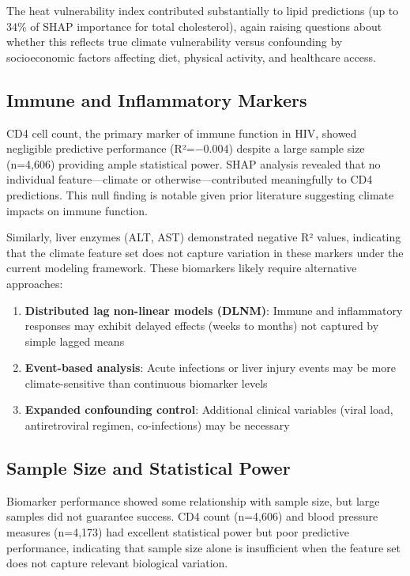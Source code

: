The heat vulnerability index contributed substantially to lipid predictions (up to 34\% of SHAP importance for total cholesterol), again raising questions about whether this reflects true climate vulnerability versus confounding by socioeconomic factors affecting diet, physical activity, and healthcare access.

\subsection{Immune and Inflammatory Markers}

CD4 cell count, the primary marker of immune function in HIV, showed negligible predictive performance (R²=−0.004) despite a large sample size (n=4,606) providing ample statistical power. SHAP analysis revealed that no individual feature---climate or otherwise---contributed meaningfully to CD4 predictions. This null finding is notable given prior literature suggesting climate impacts on immune function.

Similarly, liver enzymes (ALT, AST) demonstrated negative R² values, indicating that the climate feature set does not capture variation in these markers under the current modeling framework. These biomarkers likely require alternative approaches:

\begin{enumerate}
    \item \textbf{Distributed lag non-linear models (DLNM)}: Immune and inflammatory responses may exhibit delayed effects (weeks to months) not captured by simple lagged means
    \item \textbf{Event-based analysis}: Acute infections or liver injury events may be more climate-sensitive than continuous biomarker levels
    \item \textbf{Expanded confounding control}: Additional clinical variables (viral load, antiretroviral regimen, co-infections) may be necessary
\end{enumerate}

\subsection{Sample Size and Statistical Power}

Biomarker performance showed some relationship with sample size, but large samples did not guarantee success. CD4 count (n=4,606) and blood pressure measures (n=4,173) had excellent statistical power but poor predictive performance, indicating that sample size alone is insufficient when the feature set does not capture relevant biological variation.

